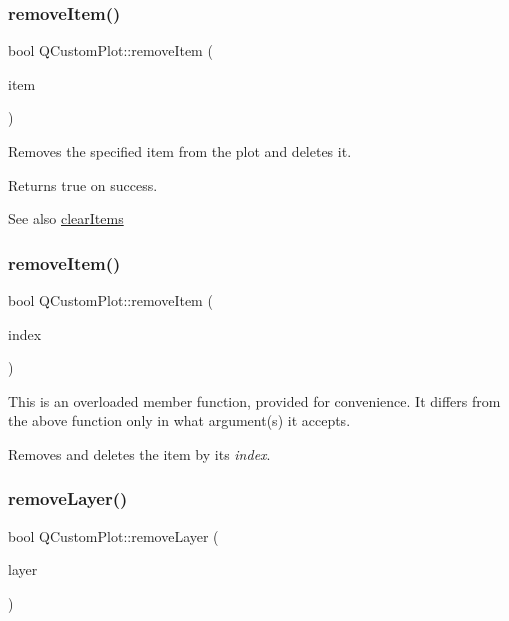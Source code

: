 \subsubsection{\texorpdfstring{remove\+Item()}{removeItem()}\hspace{0.1cm}{\footnotesize\ttfamily [1/2]}}
{\footnotesize\ttfamily bool Q\+Custom\+Plot\+::remove\+Item (\begin{DoxyParamCaption}\item[{\hyperlink{classQCPAbstractItem}{Q\+C\+P\+Abstract\+Item} $\ast$}]{item }\end{DoxyParamCaption})}

Removes the specified item from the plot and deletes it.

Returns true on success.

\begin{DoxySeeAlso}{See also}
\hyperlink{classQCustomPlot_abdfd07d4f0591d0cf967f85013fd3645}{clear\+Items} 
\end{DoxySeeAlso}
\mbox{\label{classQCustomPlot_abcfdda3d601c0441cab136137d715dea}} 
\subsubsection{\texorpdfstring{remove\+Item()}{removeItem()}\hspace{0.1cm}{\footnotesize\ttfamily [2/2]}}
{\footnotesize\ttfamily bool Q\+Custom\+Plot\+::remove\+Item (\begin{DoxyParamCaption}\item[{int}]{index }\end{DoxyParamCaption})}

This is an overloaded member function, provided for convenience. It differs from the above function only in what argument(s) it accepts.

Removes and deletes the item by its {\itshape index}. \mbox{\label{classQCustomPlot_a40f75e342c5eaab6a86066a42a0e2a94}} 
\subsubsection{\texorpdfstring{remove\+Layer()}{removeLayer()}}
{\footnotesize\ttfamily bool Q\+Custom\+Plot\+::remove\+Layer (\begin{DoxyParamCaption}\item[{\hyperlink{classQCPLayer}{Q\+C\+P\+Layer} $\ast$}]{layer }\end{DoxyParamCaption})}


